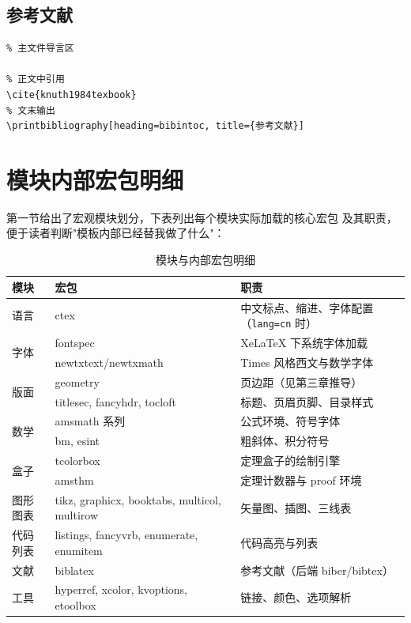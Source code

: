 \subsection{参考文献}

\begin{lstlisting}
% 主文件导言区

% 正文中引用
\cite{knuth1984texbook}
% 文末输出
\printbibliography[heading=bibintoc, title={参考文献}]
\end{lstlisting}

\section{模块内部宏包明细}

第一节给出了宏观模块划分，下表列出每个模块实际加载的核心宏包
及其职责，便于读者判断"模板内部已经替我做了什么"：

\begin{table}[htbp]
  \centering
  \caption{模块与内部宏包明细}\label{tab:packages}
  \begin{tabular}{llp{6.5cm}}
    \toprule
    模块 & 宏包 & 职责 \\
    \midrule
    语言 & ctex & 中文标点、缩进、字体配置（\texttt{lang=cn} 时）\\
    \multirow{2}{*}{字体} & fontspec & XeLaTeX 下系统字体加载 \\
                          & newtxtext/newtxmath & Times 风格西文与数学字体 \\
    \multirow{2}{*}{版面} & geometry & 页边距（见第三章推导）\\
                          & titlesec, fancyhdr, tocloft & 标题、页眉页脚、目录样式 \\
    \multirow{2}{*}{数学} & amsmath 系列 & 公式环境、符号字体 \\
                          & bm, esint & 粗斜体、积分符号 \\
    \multirow{2}{*}{盒子} & tcolorbox & 定理盒子的绘制引擎 \\
                          & amsthm & 定理计数器与 proof 环境 \\
    图形图表 & tikz, graphicx, booktabs, multicol, multirow & 矢量图、插图、三线表 \\
    代码列表 & listings, fancyvrb, enumerate, enumitem & 代码高亮与列表 \\
    文献 & biblatex & 参考文献（后端 biber/bibtex）\\
    工具 & hyperref, xcolor, kvoptions, etoolbox & 链接、颜色、选项解析 \\
    \bottomrule
  \end{tabular}
\end{table}

